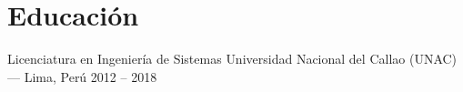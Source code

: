 
\section{Educación}

\cvEduEntry%
  {Licenciatura en Ingeniería de Sistemas}%
  {Universidad Nacional del Callao (UNAC) --- Lima, Perú}%
  {2012 -- 2018}

